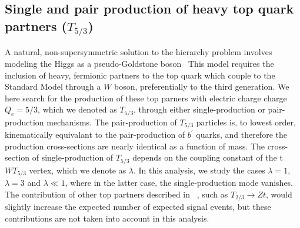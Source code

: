 
\subsection{Single and pair production of heavy top quark partners ($T_{5/3}$)}

A natural, non-supersymmetric solution to the hierarchy problem involves modeling the Higgs as a pseudo-Goldstone boson~\cite{Contino:2008hi}
This model requires the inclusion of heavy, fermionic partners to the top quark which couple to the Standard Model through a $W$ boson, preferentially to the third generation.
We here search for the production of these top parners with electric charge charge $Q_{e}=5/3$, which we denoted as $T_{5/3}$, through either single-production or pair-production mechanisms.
The pair-production of $T_{5/3}$ particles is, to lowest order, kinematically equivalant to the pair-production of $b^{\prime}$ quarks, and therefore the production cross-sections are nearly identical as a function of mass.
The cross-section of single-production of $T_{5/3}$ depends on the coupling constant of the t$WT_{5/3}$ vertex, which we denote as $\lambda$.
In this analysis, we study the cases $\lambda=1$, $\lambda=3$ and $\lambda\ll 1$, where in the latter case, the single-production mode vanishes.
The contribution of other top partners described in ~\cite{Contino:2008hi}, such as $T_{2/3} \rightarrow Zt$, would slightly increase the expected number of expected signal events, but these contributions are not taken into account in this analysis. 

